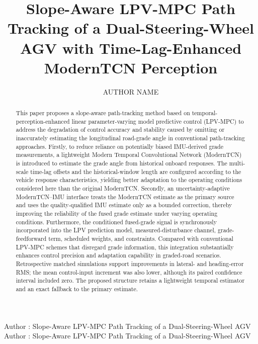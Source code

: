 \documentclass{ieeeaccess}
\begin{document}

\title{Slope-Aware LPV-MPC Path Tracking of a Dual-Steering-Wheel AGV with Time-Lag-Enhanced ModernTCN Perception}
\author{\uppercase{Author Name}}
\address[1]{Affiliation placeholder.}

\markboth
{Author \headeretal: Slope-Aware LPV-MPC Path Tracking of a Dual-Steering-Wheel AGV}
{Author \headeretal: Slope-Aware LPV-MPC Path Tracking of a Dual-Steering-Wheel AGV}


\begin{abstract}

This paper proposes a slope-aware path-tracking method based on temporal-perception-enhanced linear parameter-varying model predictive control (LPV-MPC) to address the degradation of control accuracy and stability caused by omitting or inaccurately estimating the longitudinal road-grade angle in conventional path-tracking approaches. Firstly, to reduce reliance on potentially biased IMU-derived grade measurements, a lightweight Modern Temporal Convolutional Network (ModernTCN) is introduced to estimate the grade angle from historical onboard responses. The multi-scale time-lag offsets and the historical-window length are configured according to the vehicle response characteristics, yielding better adaptation to the operating conditions considered here than the original ModernTCN. Secondly, an uncertainty-adaptive ModernTCN--IMU interface treats the ModernTCN estimate as the primary source and uses the quality-qualified IMU estimate only as a bounded correction, thereby improving the reliability of the fused grade estimate under varying operating conditions. Furthermore, the conditioned fused-grade signal is synchronously incorporated into the LPV prediction model, measured-disturbance channel, grade-feedforward term, scheduled weights, and constraints. Compared with conventional LPV-MPC schemes that disregard grade information, this integration substantially enhances control precision and adaptation capability in graded-road scenarios. Retrospective matched simulations support improvements in lateral- and heading-error RMS; the mean control-input increment was also lower, although its paired confidence interval included zero. The proposed structure retains a lightweight temporal estimator and an exact fallback to the primary estimate.
\end{abstract}
\end{document}
